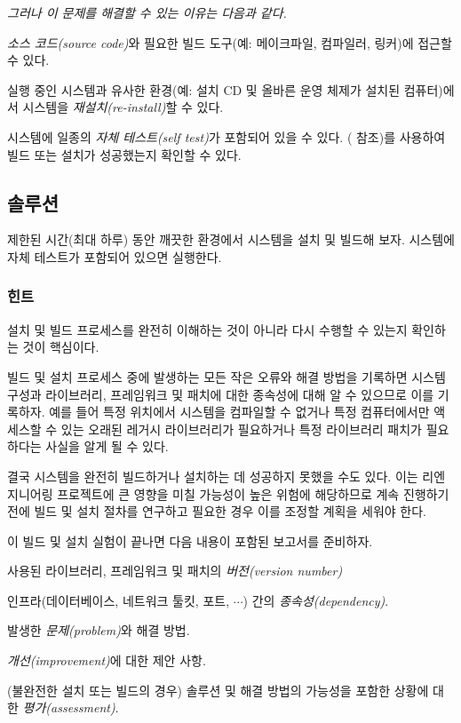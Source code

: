 \documentclass[a4paper,10pt,twoside]{book}
\begin{document}
\emph{그러나 이 문제를 해결할 수 있는 이유는 다음과 같다.}

\begin{bulletlist}
  \item \emph{소스 코드(source code)}와 필요한 빌드 도구(예: 메이크파일, 컴파일러, 링커)에 접근할 수 있다.

  \item 실행 중인 시스템과 유사한 환경(예: 설치 CD 및 올바른 운영 체제가 설치된 컴퓨터)에서 시스템을 \emph{재설치(re-install)}할 수 있다.

  \item 시스템에 일종의 \emph{자체 테스트(self test)}가 포함되어 있을 수 있다. ( 참조)를 사용하여 빌드 또는 설치가 성공했는지 확인할 수 있다.
\end{bulletlist}

\subsection*{솔루션}

제한된 시간(최대 하루) 동안 깨끗한 환경에서 시스템을 설치 및 빌드해 보자. 시스템에 자체 테스트가 포함되어 있으면 실행한다. 

\subsubsection*{힌트}

설치 및 빌드 프로세스를 완전히 이해하는 것이 아니라 다시 수행할 수 있는지 확인하는 것이 핵심이다.

빌드 및 설치 프로세스 중에 발생하는 모든 작은 오류와 해결 방법을 기록하면 시스템 구성과 라이브러리, 프레임워크 및 패치에 대한 종속성에 대해 알 수 있으므로 이를 기록하자. 예를 들어 특정 위치에서 시스템을 컴파일할 수 없거나 특정 컴퓨터에서만 액세스할 수 있는 오래된 레거시 라이브러리가 필요하거나 특정 라이브러리 패치가 필요하다는 사실을 알게 될 수 있다.

결국 시스템을 완전히 빌드하거나 설치하는 데 성공하지 못했을 수도 있다. 이는 리엔지니어링 프로젝트에 큰 영향을 미칠 가능성이 높은 위험에 해당하므로 계속 진행하기 전에 빌드 및 설치 절차를 연구하고 필요한 경우 이를 조정할 계획을 세워야 한다.

이 빌드 및 설치 실험이 끝나면 다음 내용이 포함된 보고서를 준비하자.

\begin{bulletlist}
  \item 사용된 라이브러리, 프레임워크 및 패치의 \emph{버전(version number)}

  \item 인프라(데이터베이스, 네트워크 툴킷, 포트, $\cdots$) 간의 \emph{종속성(dependency)}.

  \item 발생한 \emph{문제(problem)}와 해결 방법.

  \item \emph{개선(improvement)}에 대한 제안 사항.

  \item (불완전한 설치 또는 빌드의 경우) 솔루션 및 해결 방법의 가능성을 포함한 상황에 대한 \emph{평가(assessment)}.
\end{bulletlist}
\end{document}
